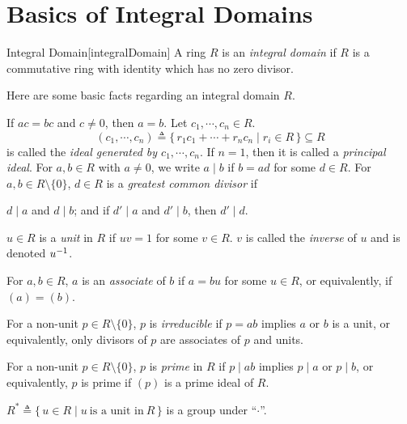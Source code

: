 \documentclass[../modern_algebra_2.tex]{subfiles}
\begin{document}
\section{Basics of Integral Domains}

\begin{Definition}{Integral Domain}[integralDomain]
    A ring \(R\) is an \emph{integral domain} if
    \(R\) is a commutative ring with identity which has no zero divisor.
\end{Definition}

\begin{note}
    Here are some basic facts regarding an integral domain \(R\).
    \begin{enumerate}[label=(\arabic*)]
        \ii If \(ac = bc\) and \(c \neq 0\), then \(a = b\).
        \ii
        Let \(c_1, \cdots, c_n \in R\).
        \[
            (c_1, \cdots, c_n)
            \triangleq \{\,r_1c_1 + \cdots + r_nc_n \mid r_i \in R\,\} \subseteq R
        \]
        is called the \emph{ideal generated by \(c_1, \cdots, c_n\)}.
        If \(n = 1\), then it is called a \emph{principal ideal}.
        \ii
        For \(a, b \in R\) with \(a \neq 0\),
        we write \(a \mid b\) if \(b = ad\) for some \(d \in R\).
        \ii
        For \(a, b \in R \setminus \{0\}\),
        \(d \in R\) is a \emph{greatest common divisor} if
        \begin{enumerate}[label=(\roman*)]
            \ii
            \(d \mid a\) and \(d \mid b\); and
            \ii
            if \(d' \mid a\) and \(d' \mid b\), then \(d' \mid d\).
        \end{enumerate}
        \ii
        \(u \in R\) is a \emph{unit} in \(R\)
        if \(uv = 1\) for some \(v \in R\).
        \(v\) is called the \emph{inverse} of \(u\) and is denoted \(u^{-1}\).

        \ii
        For \(a, b \in R\), \(a\) is an \emph{associate} of \(b\) if \(a = bu\) for some \(u \in
        R\), or equivalently, if \((a) = (b)\).

        \ii
        For a non-unit \(p \in R \setminus \{0\}\), \(p\) is \emph{irreducible} if \(p = ab\)
        implies \(a\) or \(b\) is a unit, or equivalently, only divisors of \(p\) are associates of
        \(p\) and units.

        \ii
        For a non-unit \(p \in R \setminus \{0\}\), \(p\) is \emph{prime} in \(R\) if \(p \mid ab\)
        implies \(p \mid a\) or \(p \mid b\), or equivalently, \(p\) is prime if \((p)\) is a prime
        ideal of \(R\).

        \ii
        \(R^\ast \triangleq \{\,u \in R \mid u~\text{is a unit in}~R\,\}\)
        is a group under ``\(\cdot\)''.
    \end{enumerate}
\end{note}
\end{document}
